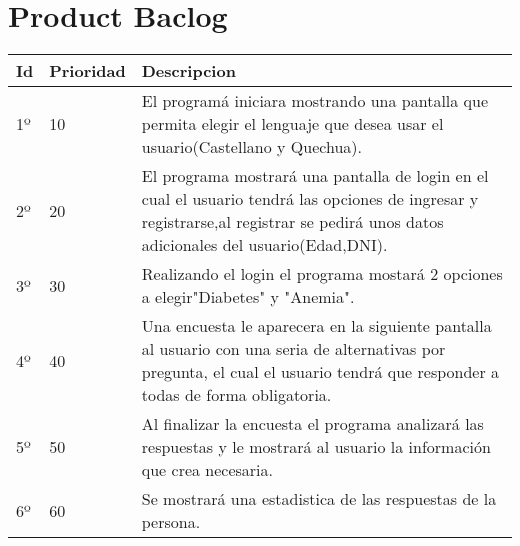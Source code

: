 \chapter{Product Baclog}



\begin{table}[htbp]
	\begin{center}
		\begin{tabular}{| p{3.2cm}| p{4.2cm} |p{7.8cm} |}
			\hline
			\textbf{Id} & \textbf {Prioridad} & \textbf{Descripcion} \\\hline    
			1º & 10 & El programá iniciara mostrando una pantalla que permita elegir el lenguaje que desea usar el usuario(Castellano y Quechua).\\ \hline
			2º & 20 & El programa mostrará una pantalla de login en el cual el usuario tendrá las opciones de ingresar y registrarse,al registrar se pedirá unos datos adicionales del usuario(Edad,DNI).\\ \hline
			3º & 30 & Realizando el login el programa mostará 2 opciones a elegir"Diabetes" y "Anemia".\\ \hline
			4º & 40 & Una encuesta le aparecera en la siguiente pantalla al usuario con una seria de alternativas por pregunta, 
			el cual el usuario tendrá que responder a todas de forma obligatoria.\\ \hline
			5º & 50 & Al finalizar la encuesta el programa analizará las respuestas y le mostrará al usuario la información que crea necesaria.\\ \hline
			6º & 60 & Se mostrará una estadistica de las respuestas de la persona.\\ \hline
		\end{tabular}
	\end{center}
\end{table}
